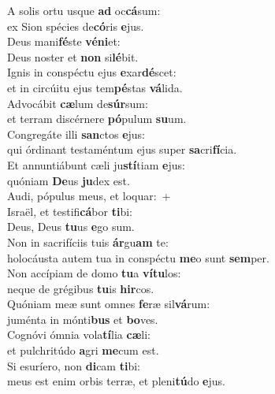 \evenverse A solis ortu usque \textbf{ad} oc\textbf{cá}sum:~\*\\
\evenverse ex Sion spécies de\textbf{có}ris \textbf{e}jus.\\
\oddverse Deus mani\textbf{fé}ste \textbf{vé}\textbf{ni}et:~\*\\
\oddverse Deus noster et \textbf{non} si\textbf{lé}bit.\\
\evenverse Ignis in conspéctu ejus \textbf{e}xar\textbf{dé}scet:~\*\\
\evenverse et in circúitu ejus tem\textbf{pé}stas \textbf{vá}lida.\\
\oddverse Advocábit \textbf{cæ}lum de\textbf{súr}sum:~\*\\
\oddverse et terram discérnere \textbf{pó}pulum \textbf{su}um.\\
\evenverse Congregáte illi \textbf{san}ctos \textbf{e}jus:~\*\\
\evenverse qui órdinant testaméntum ejus super \textbf{sa}cri\textbf{fí}cia.\\
\oddverse Et annuntiábunt cæli ju\textbf{stí}tiam \textbf{e}jus:~\*\\
\oddverse quóniam \textbf{De}us \textbf{ju}dex est.\\
\evenverse Audi, pópulus meus, et loquar:~+\\
\evenverse  Israël, et testifi\textbf{cá}bor \textbf{ti}bi:~\*\\
\evenverse Deus, Deus \textbf{tu}us \textbf{e}go sum.\\
\oddverse Non in sacrifíciis tuis \textbf{ár}gu\textbf{am} te:~\*\\
\oddverse holocáusta autem tua in conspéctu \textbf{me}o sunt \textbf{sem}per.\\
\evenverse Non accípiam de domo \textbf{tu}a \textbf{ví}\textbf{tu}los:~\*\\
\evenverse neque de grégibus \textbf{tu}is \textbf{hir}cos.\\
\oddverse Quóniam meæ sunt omnes \textbf{fe}ræ sil\textbf{vá}rum:~\*\\
\oddverse juménta in mónti\textbf{bus} et \textbf{bo}ves.\\
\evenverse Cognóvi ómnia vola\textbf{tí}lia \textbf{cæ}li:~\*\\
\evenverse et pulchritúdo \textbf{a}gri \textbf{me}cum est.\\
\oddverse Si esuríero, non \textbf{di}cam \textbf{ti}bi:~\*\\
\oddverse meus est enim orbis terræ, et pleni\textbf{tú}do \textbf{e}jus.\\
